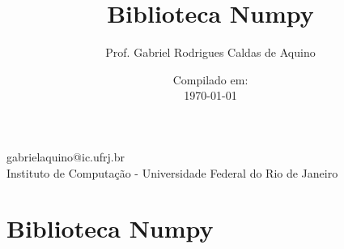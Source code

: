 
\title{Biblioteca Numpy}

\author{Prof. Gabriel Rodrigues Caldas de Aquino}

\institute
{
    gabrielaquino@ic.ufrj.br\\

    Instituto de Computação -
    Universidade Federal do Rio de Janeiro %
}
\date{Compilado em: \\ \today} %


\section{Biblioteca Numpy}

\begin{frame}
    \titlepage
\end{frame}



